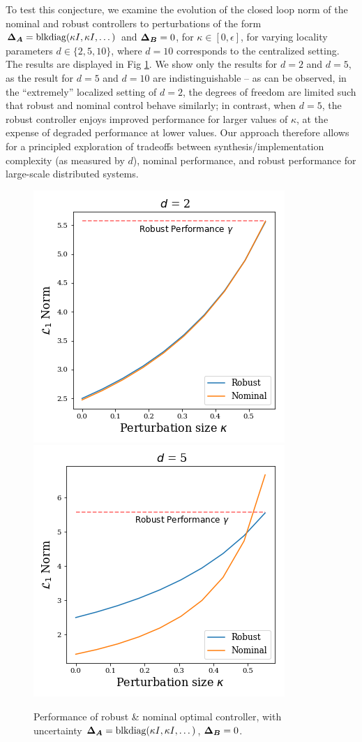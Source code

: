 To test this conjecture, we examine the evolution of the closed loop norm of the nominal and robust controllers to perturbations of the form ${\boldsymbol{\Delta}}_{\boldsymbol{A}} = \mathrm{blkdiag}(\kappa I, \kappa I, \dots)$ and ${\boldsymbol{\Delta}}_{\boldsymbol{B}} = 0$, for $\kappa \in [0,\epsilon]$, for varying locality parameters $d\in\{2,5,10\}$, where $d=10$ corresponds to the centralized setting.  The results are displayed in Fig \ref{fig:kappa}.  We show only the results for $d=2$ and $d=5$, as the result for $d=5$ and $d=10$ are indistinguishable -- as can be observed, in the ``extremely'' localized setting of $d=2$, the degrees of freedom are limited such that robust and nominal control behave similarly; in contrast, when $d=5$, the robust controller enjoys improved performance for larger values of $\kappa$, at the expense of degraded performance at lower values.  Our approach therefore allows for a principled exploration of tradeoffs between synthesis/implementation complexity (as measured by $d$), nominal performance, and robust performance for large-scale distributed systems.

\begin{figure}
\includegraphics[width=.45\columnwidth]{d2.png}~\includegraphics[width=.45\columnwidth]{d5.png}
\caption{Performance of robust \& nominal optimal controller, with uncertainty  ${\boldsymbol{\Delta}}_{\boldsymbol{A}} = \mathrm{blkdiag}(\kappa I, \kappa I, \dots)$, ${\boldsymbol{\Delta}}_{\boldsymbol{B}} = 0$. }%
\label{fig:kappa}
\end{figure}

